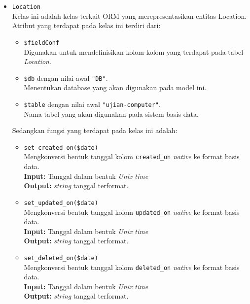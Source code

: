 \begin{itemize}
        \item \texttt{Location} \\
            Kelas ini adalah kelas terkait ORM yang merepresentasikan entitas
            Location. Atribut yang terdapat pada kelas ini terdiri dari:
            \begin{itemize}
                \item \texttt{\$fieldConf} \\
                    Digunakan untuk mendefinisikan kolom-kolom yang terdapat
                    pada tabel \textit{Location}.
                \item \texttt{\$db} dengan nilai awal \texttt{"DB"}. \\
                    Menentukan database yang akan digunakan pada model ini.
                \item \texttt{\$table} dengan nilai awal
                \texttt{"ujian-computer"}. \\
                    Nama tabel yang akan digunakan pada sistem basis data. 
            \end{itemize}
            Sedangkan fungsi yang terdapat pada kelas ini adalah:
            \begin{itemize}
                \item \texttt{set\_created\_on(\$date)} \\
                    Mengkonversi bentuk tanggal kolom \texttt{created\_on}
                    \textit{native} ke format basis data. \\
                    \textbf{Input:} Tanggal dalam bentuk \textit{Unix time}\\
                    \textbf{Output:} \textit{string} tanggal terformat.
                
                \item \texttt{set\_updated\_on(\$date)} \\
                    Mengkonversi bentuk tanggal kolom \texttt{updated\_on}
                    \textit{native} ke format basis data. \\
                    \textbf{Input:} Tanggal dalam bentuk \textit{Unix time}\\
                    \textbf{Output:} \textit{string} tanggal terformat.
                    
                \item \texttt{set\_deleted\_on(\$date)} \\
                    Mengkonversi bentuk tanggal kolom \texttt{deleted\_on}
                    \textit{native} ke format basis data. \\
                    \textbf{Input:} Tanggal dalam bentuk \textit{Unix time}\\
                    \textbf{Output:} \textit{string} tanggal terformat.
                    

\end{itemize}
\end{itemize}
